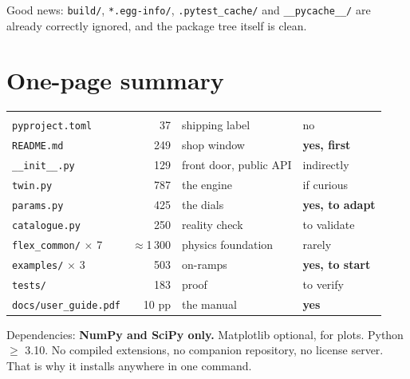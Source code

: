 \documentclass[11pt,a4paper]{article}
\newcommand{\pkg}[1]{\texttt{#1}}
\begin{document}
\noindent Good news: \pkg{build/}, \pkg{*.egg-info/}, \pkg{.pytest\_cache/} and
\pkg{\_\_pycache\_\_/} are already correctly ignored, and the package tree
itself is clean.

\section{One-page summary}

\begin{tabularx}{\textwidth}{@{}l r Y l@{}}
 &  &  &  \\
\pkg{pyproject.toml} & 37 & shipping label & no \\
\pkg{README.md} & 249 & shop window & \textbf{yes, first} \\
\pkg{\_\_init\_\_.py} & 129 & front door, public API & indirectly \\
\pkg{twin.py} & 787 & the engine & if curious \\
\pkg{params.py} & 425 & the dials & \textbf{yes, to adapt} \\
\pkg{catalogue.py} & 250 & reality check & to validate \\
\pkg{flex\_common/} $\times$ 7 & $\approx$1\,300 & physics foundation &
rarely \\
\pkg{examples/} $\times$ 3 & 503 & on-ramps & \textbf{yes, to start} \\
\pkg{tests/} & 183 & proof & to verify \\
\pkg{docs/user\_guide.pdf} & 10 pp & the manual & \textbf{yes} \\
\end{tabularx}

\vspace{10pt}
\noindent Dependencies: \textbf{NumPy and SciPy only.} Matplotlib optional, for
plots. Python $\geq$ 3.10. No compiled extensions, no companion repository, no
license server. That is why it installs anywhere in one command.
\end{document}
